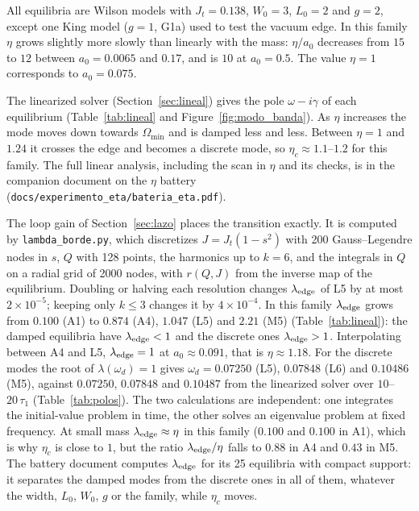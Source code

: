 \documentclass[11pt,a4paper]{article}
\begin{document}
All equilibria are Wilson models with $J_t=0.138$, $W_0=3$, $L_0=2$ and $g=2$, except one
King model ($g=1$, G1a) used to test the vacuum edge. In this family $\eta$ grows slightly
more slowly than linearly with the mass: $\eta/a_0$ decreases from $15$ to $12$ between
$a_0=0.0065$ and $0.17$, and is $10$ at $a_0=0.5$. The value $\eta=1$ corresponds to
$a_0=0.075$.

The linearized solver (Section~\ref{sec:lineal}) gives the pole $\omega-i\gamma$ of each
equilibrium (Table~\ref{tab:lineal} and Figure~\ref{fig:modo_banda}). As $\eta$
increases the mode moves down towards $\Omega_{\min}$ and is damped less and less.
Between $\eta=1$ and $1.24$ it crosses the edge and becomes a discrete mode, so
$\eta_c\approx1.1$--$1.2$ for this family. The full linear analysis, including the scan
in $\eta$ and its checks, is in the companion document on the $\eta$ battery
(\texttt{docs/\allowbreak experimento\_\allowbreak eta/\allowbreak bateria\_\allowbreak eta.pdf}).

The loop gain of Section~\ref{sec:lazo} places the transition exactly. It is computed by
\texttt{lambda\_\allowbreak borde.py}, which discretizes $J=J_t(1-s^2)$ with 200 Gauss--Legendre nodes
in $s$, $Q$ with 128 points, the harmonics up to $k=6$, and the integrals in $Q$ on a radial
grid of 2000 nodes, with $r(Q,J)$ from the inverse map of the equilibrium. Doubling or
halving each resolution changes $\lambda_{\rm edge}$ of L5 by at most $2\times10^{-5}$; keeping only
$k\le3$ changes it by $4\times10^{-4}$. In this family $\lambda_{\rm edge}$ grows from $0.100$ (A1) to
$0.874$ (A4), $1.047$ (L5) and $2.21$ (M5) (Table~\ref{tab:lineal}): the damped equilibria have
$\lambda_{\rm edge}<1$ and the discrete ones $\lambda_{\rm edge}>1$. Interpolating between A4 and L5,
$\lambda_{\rm edge}=1$ at $a_0\approx0.091$, that is $\eta\approx1.18$. For the discrete modes the root of
$\lambda(\omega_d)=1$ gives $\omega_d=0.07250$ (L5), $0.07848$ (L6) and $0.10486$ (M5), against
$0.07250$, $0.07848$ and $0.10487$ from the linearized solver over $10$--$20\,\tau_1$
(Table~\ref{tab:polos}). The two calculations are independent: one integrates the
initial-value problem in time, the other solves an eigenvalue problem at fixed frequency.
At small mass $\lambda_{\rm edge}\approx\eta$ in this family ($0.100$ and $0.100$ in A1), which is why
$\eta_c$ is close to $1$, but the ratio $\lambda_{\rm edge}/\eta$ falls to $0.88$ in A4 and $0.43$ in M5.
The battery document computes $\lambda_{\rm edge}$ for its 25 equilibria with compact support: it
separates the damped modes from the discrete ones in all of them, whatever the width,
$L_0$, $W_0$, $g$ or the family, while $\eta_c$ moves.
\end{document}
